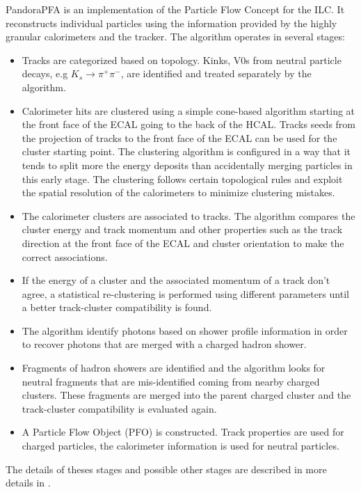 PandoraPFA \cite{Thomson:2009rp, Marshall2013} is an implementation of the Particle Flow Concept for the ILC. It reconstructs individual particles using the information provided by the highly granular calorimeters and the tracker. The algorithm operates in several stages:

\begin{itemize}
  \item Tracks are categorized based on topology. Kinks, V0s from neutral particle decays, e.g $K_s \rightarrow \pi^+\pi^-$, are identified and treated separately by the algorithm.
  \item Calorimeter hits are clustered using a simple cone-based algorithm starting at the front face of the ECAL going to the back of the HCAL. Tracks seeds from the projection of tracks to the front face of the ECAL can be used for the cluster starting point. The clustering algorithm is configured in a way that it tends to split more the energy deposits than accidentally merging particles in this early stage. The clustering follows certain topological rules and exploit the spatial resolution of the calorimeters to minimize clustering mistakes.
  \item The calorimeter clusters are associated to tracks. The algorithm compares the cluster energy and track momentum and other properties such as the track direction at the front face of the ECAL and cluster orientation to make the correct associations.
  \item If the energy of a cluster and the associated momentum of a track don't agree, a statistical re-clustering is performed using different parameters until a better track-cluster compatibility is found.
  \item The algorithm identify photons based on shower profile information in order to recover photons that are merged with a charged hadron shower.
  \item Fragments of hadron showers are identified and the algorithm looks for neutral fragments that are mis-identified coming from nearby charged clusters. These fragments are merged into the parent charged cluster and the track-cluster compatibility is evaluated again.
  \item A Particle Flow Object (PFO) is constructed. Track properties are used for charged particles, the calorimeter information is used for neutral particles.
\end{itemize}

The details of theses stages and possible other stages are described in more details in \cite{Thomson:2009rp}.

